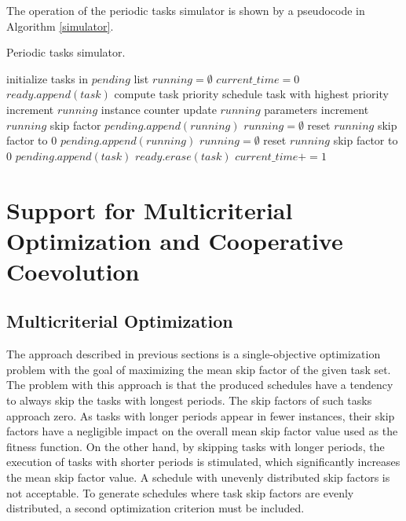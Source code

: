 The operation of the periodic tasks simulator is shown by a pseudocode in Algorithm \ref{simulator}.
\begin{algorithm}
\caption{Periodic tasks simulator.\label{simulator}}
\begin{algorithmic}
\STATE initialize tasks in $pending$ list
\STATE $running = \emptyset$
\STATE $current\_time = 0$
			\STATE $ready.append(task)$
		\ENDIF
	\ENDFOR
		\STATE compute task priority
	\ENDFOR
	\STATE schedule task with highest priority
			\STATE increment $running$ instance counter
			\STATE update $running$ parameters
			\STATE increment $running$ skip factor
			\STATE $pending.append(running)$
			\STATE $running = \emptyset$
		\ELSE 
				\STATE reset $running$ skip factor to $0$
				\STATE $pending.append(running)$
				\STATE $running = \emptyset$ 
			\ENDIF
		\ENDIF
	\ENDIF
			\STATE reset $running$ skip factor to $0$
			\STATE $pending.append(task)$
			\STATE $ready.erase(task)$
		\ENDIF
	\ENDFOR
	\STATE $current\_time+=1$
\ENDWHILE
\end{algorithmic}
\end{algorithm}

\section{Support for Multicriterial Optimization and Cooperative Coevolution}
\subsection{Multicriterial Optimization}
The approach described in previous sections is a single-objective optimization problem with the goal of maximizing the mean skip factor of the given task set.
The problem with this approach is that the produced schedules have a tendency to always skip the tasks with longest periods.
The skip factors of such tasks approach zero.
As tasks with longer periods appear in fewer instances, their skip factors have a negligible impact on the overall mean skip factor value used as the fitness function.
On the other hand, by skipping tasks with longer periods, the execution of tasks with shorter periods is stimulated, which significantly increases the mean skip factor value.
A schedule with unevenly distributed skip factors is not acceptable.
To generate schedules where task skip factors are evenly distributed, a second optimization criterion must be included.

